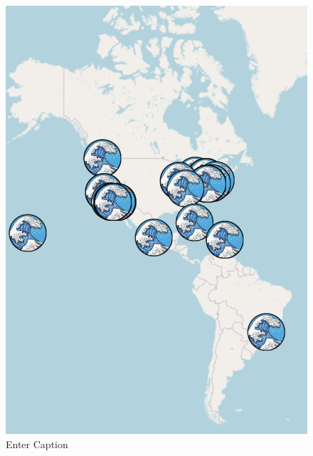 \documentclass[a4paper, twoside, 12pt]{book}
\begin{document}
\begin{figure}
    \centering
    \includegraphics[width=1\linewidth]{Screenshot 2023-06-15 at 00.41.16.png}
    \caption{Enter Caption}
    \label{fig:enter-label}
\end{figure}
\end{document}
